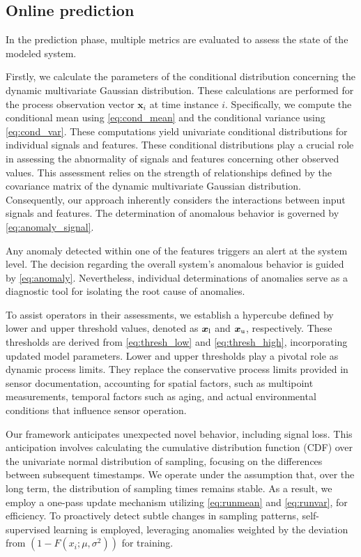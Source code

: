 \subsection{Online prediction}\label{predict}
In the prediction phase, multiple metrics are evaluated to assess the state of the modeled system.

Firstly, we calculate the parameters of the conditional distribution concerning the dynamic multivariate Gaussian distribution. These calculations are performed for the process observation vector $\boldsymbol{x}_i$ at time instance $i$. Specifically, we compute the conditional mean using \eqref{eq:cond_mean} and the conditional variance using \eqref{eq:cond_var}. These computations yield univariate conditional distributions for individual signals and features. These conditional distributions play a crucial role in assessing the abnormality of signals and features concerning other observed values. This assessment relies on the strength of relationships defined by the covariance matrix of the dynamic multivariate Gaussian distribution. Consequently, our approach inherently considers the interactions between input signals and features. The determination of anomalous behavior is governed by \eqref{eq:anomaly_signal}.

Any anomaly detected within one of the features triggers an alert at the system level. The decision regarding the overall system's anomalous behavior is guided by \eqref{eq:anomaly}. Nevertheless, individual determinations of anomalies serve as a diagnostic tool for isolating the root cause of anomalies.

To assist operators in their assessments, we establish a hypercube defined by lower and upper threshold values, denoted as $\boldsymbol{x} _{\text{l}}$ and $\boldsymbol{x} _{\text{u}}$, respectively. These thresholds are derived from \eqref{eq:thresh_low} and \eqref{eq:thresh_high}, incorporating updated model parameters. Lower and upper thresholds play a pivotal role as dynamic process limits. They replace the conservative process limits provided in sensor documentation, accounting for spatial factors, such as multipoint measurements, temporal factors such as aging, and actual environmental conditions that influence sensor operation.

Our framework anticipates unexpected novel behavior, including signal loss. This anticipation involves calculating the cumulative distribution function (CDF) over the univariate normal distribution of sampling, focusing on the differences between subsequent timestamps. We operate under the assumption that, over the long term, the distribution of sampling times remains stable. As a result, we employ a one-pass update mechanism utilizing \eqref{eq:runmean} and \eqref{eq:runvar}, for efficiency. To proactively detect subtle changes in sampling patterns, self-supervised learning is employed, leveraging anomalies weighted by the deviation from $(1 - F(x_i; \mu, \sigma^2))$ for training.

